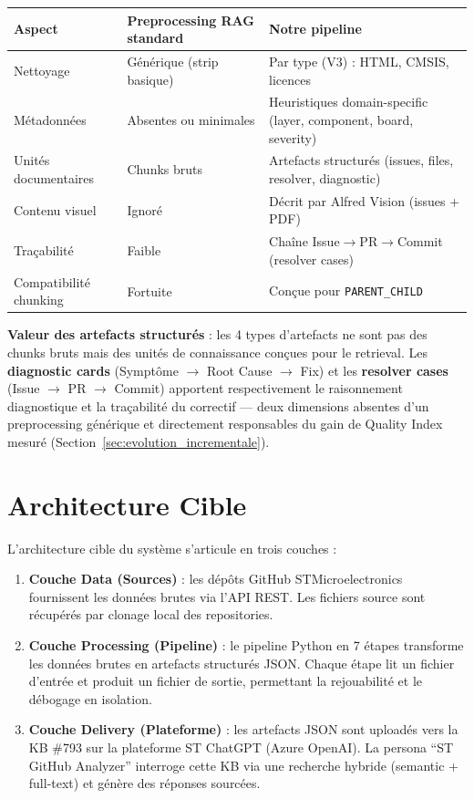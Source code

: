 \documentclass[12pt,a4paper]{report}
\begin{document}
\begin{longtable}{p{4cm}p{4.5cm}p{4.5cm}}
\toprule
\textbf{Aspect} & \textbf{Preprocessing RAG standard} & \textbf{Notre pipeline} \\
\midrule
Nettoyage & Générique (strip basique) & Par type (V3) : HTML, CMSIS, licences \\
Métadonnées & Absentes ou minimales & Heuristiques domain-specific (layer, component, board, severity) \\
Unités documentaires & Chunks bruts & Artefacts structurés (issues, files, resolver, diagnostic) \\
Contenu visuel & Ignoré & Décrit par Alfred Vision (issues + PDF) \\
Traçabilité & Faible & Chaîne Issue$\to$PR$\to$Commit (resolver cases) \\
Compatibilité chunking & Fortuite & Conçue pour \texttt{PARENT\_CHILD} \\
\bottomrule
\end{longtable}

\textbf{Valeur des artefacts structurés} : les 4 types d'artefacts ne sont pas des chunks bruts mais des unités de connaissance conçues pour le retrieval. Les \textbf{diagnostic cards} (Symptôme $\to$ Root Cause $\to$ Fix) et les \textbf{resolver cases} (Issue $\to$ PR $\to$ Commit) apportent respectivement le raisonnement diagnostique et la traçabilité du correctif --- deux dimensions absentes d'un preprocessing générique et directement responsables du gain de Quality Index mesuré (Section~\ref{sec:evolution_incrementale}).

\section{Architecture Cible}
\label{sec:architecture_cible}

L'architecture cible du système s'articule en trois couches :

\begin{enumerate}
  \item \textbf{Couche Data (Sources)} : les dépôts GitHub STMicroelectronics fournissent les données brutes via l'API REST. Les fichiers source sont récupérés par clonage local des repositories.
  
  \item \textbf{Couche Processing (Pipeline)} : le pipeline Python en 7 étapes transforme les données brutes en artefacts structurés JSON. Chaque étape lit un fichier d'entrée et produit un fichier de sortie, permettant la rejouabilité et le débogage en isolation.
  
  \item \textbf{Couche Delivery (Plateforme)} : les artefacts JSON sont uploadés vers la KB \#793 sur la plateforme ST ChatGPT (Azure OpenAI). La persona ``ST GitHub Analyzer'' interroge cette KB via une recherche hybride (semantic + full-text) et génère des réponses sourcées.
\end{enumerate}
\end{document}
